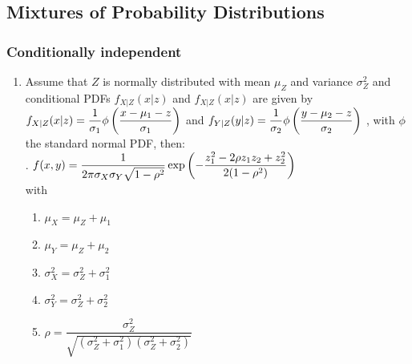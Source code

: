 \subsection{Mixtures of Probability Distributions}

\subsubsection{Conditionally independent}

\begin{enumerate}
    \item Assume that $Z$ is normally distributed with mean $\mu_Z$ and variance $\sigma^2_Z$ and conditional PDFs $f_{X|Z} (x|z)$ and $f_{X|Z} (x|z)$ are given by $f_{X|Z} (x|z) = \dfrac{1}{\sigma_1} \phi\left(\dfrac{x - \mu_1 - z}{\sigma_1}\right)$ and $f_{Y |Z} (y|z) = \dfrac{1}{\sigma_2} \phi\left(\dfrac{y - \mu_2 - z}{\sigma_2}\right)$ , with $\phi$ the standard normal PDF, then:
    \hfill \cite{statistics/book/Statistics-for-Data-Scientists/Maurits-Kaptein}
    \\
    .\hfill
    $
        f (x, y)
        = \dfrac{1}{ 2\pi\sigma_X \sigma_Y \sqrt{1 - \rho^2} }
        \exp \left(
            - \dfrac{z^2_1 - 2\rho z_1z_2 + z^2_2 }{2(1 - \rho^2)}
        \right)
    $
    \hfill \cite{statistics/book/Statistics-for-Data-Scientists/Maurits-Kaptein}
    \\
    with
    \begin{multicols}{2}
    \begin{enumerate}
        \item $\mu_X = \mu_Z + \mu_1$
        \hfill \cite{statistics/book/Statistics-for-Data-Scientists/Maurits-Kaptein}

        \item $\mu_Y = \mu_Z + \mu_2$
        \hfill \cite{statistics/book/Statistics-for-Data-Scientists/Maurits-Kaptein}

        \item $\sigma^2_X = \sigma^2_Z + \sigma^2_1$
        \hfill \cite{statistics/book/Statistics-for-Data-Scientists/Maurits-Kaptein}

        \item $\sigma^2_Y = \sigma^2_Z + \sigma^2_2$
        \hfill \cite{statistics/book/Statistics-for-Data-Scientists/Maurits-Kaptein}

        \item $\rho = \dfrac{\sigma^2_Z }{\sqrt{(\sigma^2_Z + \sigma^2_1 )(\sigma^2_Z + \sigma^2_2 )}}$
        \hfill \cite{statistics/book/Statistics-for-Data-Scientists/Maurits-Kaptein}
    \end{enumerate}
    \end{multicols}
\end{enumerate}












